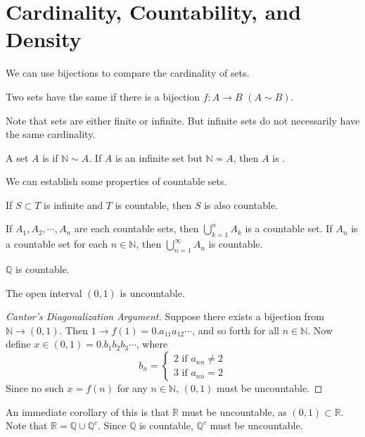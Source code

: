 \section{Cardinality, Countability, and Density}
We can use bijections to compare the cardinality of sets. 
\begin{definition}
Two sets have the same  if there is a bijection $f: A \longrightarrow B$ $(A\sim B)$.
\end{definition}
Note that sets are either finite or infinite. But infinite sets do not necessarily have the same cardinality.
\begin{definition}
A set $A$ is  if $\mathbb{N} \sim A$. If $A$ is an infinite set but $\mathbb{N} \nsim A$, then $A$ is . 
\end{definition}
We can establish some properties of countable sets. 
\begin{theorem}
If $S \subset T$ is infinite and $T$ is countable, then $S$ is also countable. 
\end{theorem}
\begin{theorem}
If $A_1, A_2, \cdots, A_n$ are each countable sets, then $\bigcup_{k=1}^n A_k$ is a countable set. If $A_n$ is a countable set for each $n \in \mathbb{N}$, then $\bigcup_{n=1}^\infty A_n$ is countable. 
\end{theorem}
\begin{theorem}
$\mathbb{Q}$ is countable. 
\end{theorem}
\begin{theorem}[Cantor]
The open interval $(0,1)$ is uncountable. 
\end{theorem}
\begin{proof}[Cantor's Diagonalization Argument]
Suppose there exists a bijection from $\mathbb{N} \longrightarrow (0,1)$. Then $1 \longrightarrow f(1) =  0.a_{11}a_{12}\cdots$, and so forth for all $n \in \mathbb{N}$. Now define $x \in (0,1) = 0.b_1b_2b_3\cdots$, where 
\[b_n =  
\begin{cases}
2 \text{ if } a_{nn} \neq 2 \\ 
3 \text{ if } a_{nn} = 2
\end{cases}
\]
Since no such $x = f(n)$ for any $n \in \mathbb{N}$, $(0,1)$ must be uncountable. 
\end{proof}
An immediate corollary of this is that $\mathbb{R}$ must be uncountable, as $(0,1) \subset \mathbb{R}$. Note that $\mathbb{R} = \mathbb{Q} \cup \mathbb{Q}^c$. Since $\mathbb{Q}$ is countable, $\mathbb{Q}^c$ must be uncountable.

